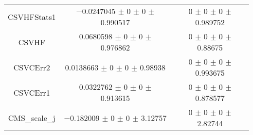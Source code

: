 \begin{table}
\begin{tabular}{ccc}
CSVHFStats1 	& \num{-0.0247045} $\pm$ \num{0} $\pm$ \num{0} $\pm$ \num{0.990517} 	& \num{0} $\pm$ \num{0} $\pm$ \num{0} $\pm$ \num{0.989752}\\
CSVHF 	& \num{0.0680598} $\pm$ \num{0} $\pm$ \num{0} $\pm$ \num{0.976862} 	& \num{0} $\pm$ \num{0} $\pm$ \num{0} $\pm$ \num{0.88675}\\
CSVCErr2 	& \num{0.0138663} $\pm$ \num{0} $\pm$ \num{0} $\pm$ \num{0.98938} 	& \num{0} $\pm$ \num{0} $\pm$ \num{0} $\pm$ \num{0.993675}\\
CSVCErr1 	& \num{0.0322762} $\pm$ \num{0} $\pm$ \num{0} $\pm$ \num{0.913615} 	& \num{0} $\pm$ \num{0} $\pm$ \num{0} $\pm$ \num{0.878577}\\
CMS\_scale\_j 	& \num{-0.182009} $\pm$ \num{0} $\pm$ \num{0} $\pm$ \num{3.12757} 	& \num{0} $\pm$ \num{0} $\pm$ \num{0} $\pm$ \num{2.82744}\\
\bottomrule
\end{tabular}
\end{table}